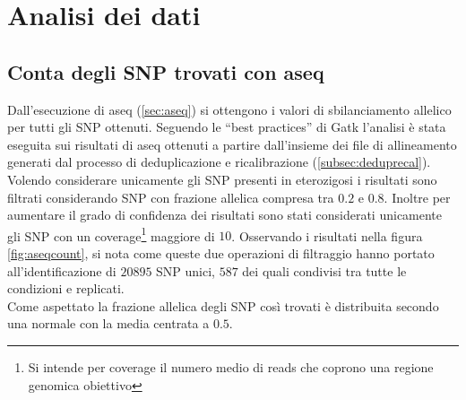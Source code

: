 \graphicspath{{chapters/04/media/}}
\chapter{Analisi dei dati}
\label{cha:analisi}
\section{Conta degli SNP trovati con aseq}
\label{sec:snpcount}
Dall'esecuzione di aseq (\ref{sec:aseq}) si ottengono i valori di sbilanciamento allelico per tutti gli SNP ottenuti.
Seguendo le ``best practices'' di Gatk \cite{gatk} l'analisi \`e stata eseguita sui risultati di aseq ottenuti a partire dall'insieme dei file di allineamento generati dal processo di deduplicazione e ricalibrazione (\ref{subsec:deduprecal}).\\
Volendo considerare unicamente gli SNP presenti in eterozigosi i risultati sono filtrati considerando SNP con frazione allelica compresa tra $0.2$ e $0.8$.
Inoltre per aumentare il grado di confidenza dei risultati sono stati considerati unicamente gli SNP con un coverage\footnote{Si intende per coverage il numero medio di reads che coprono una regione genomica obiettivo} maggiore di $10$.
Osservando i risultati nella figura \ref{fig:aseqcount}, si nota come queste due operazioni di filtraggio hanno portato all'identificazione di $20895$ SNP unici, $587$ dei quali condivisi tra tutte le condizioni e replicati.\\
Come aspettato la frazione allelica degli SNP cos\`i trovati \`e distribuita secondo una normale con la media centrata a $0.5$.\\
